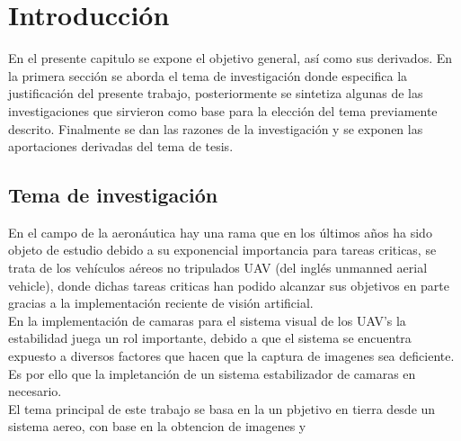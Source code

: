 %

\chapter{Introducción}
\label{sec:intro}



En el presente capitulo se expone el objetivo general, así como sus derivados. En la
primera sección se aborda el tema de investigación donde especifica la justificación del
presente trabajo, posteriormente se sintetiza algunas de las investigaciones que sirvieron
como base para la elección del tema previamente descrito. Finalmente se dan las razones
de la investigación y se exponen las aportaciones derivadas del tema de tesis.

\section{Tema de investigación}
En el campo de la aeronáutica hay una rama que en los últimos años ha sido objeto
de estudio debido a su exponencial importancia para tareas criticas, se trata de los
vehículos aéreos no tripulados UAV (del inglés unmanned aerial vehicle), donde dichas
tareas criticas han podido alcanzar sus objetivos en parte gracias a la implementación
reciente de visión artificial.\\
En la implementación de camaras para el sistema visual de los UAV's la estabilidad
juega un rol importante, debido a que el sistema se encuentra expuesto a diversos
factores que hacen que la captura de imagenes sea deficiente. Es por ello que la
impletanción de un sistema estabilizador de camaras en necesario.\\
El tema principal de este trabajo se basa en la  un pbjetivo en tierra desde un
sistema aereo, con base en la obtencion de imagenes y

